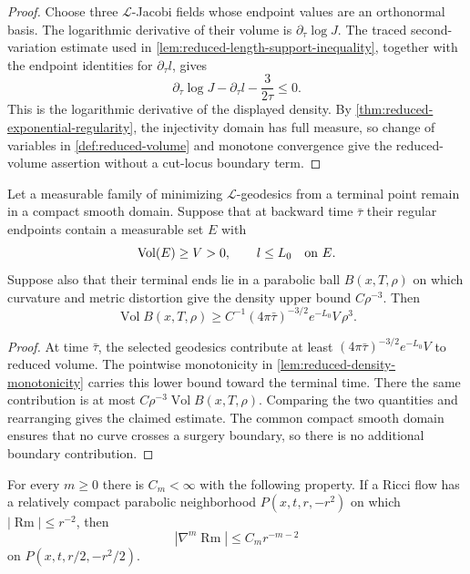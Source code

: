 \begin{proof}
Choose three $\mathcal L$-Jacobi fields whose endpoint values are an
orthonormal basis.  The logarithmic derivative of their volume is
$\partial_\tau\log J$.  The traced second-variation estimate used in
\ref{lem:reduced-length-support-inequality}, together with the endpoint
identities for $\partial_\tau l$, gives
\[
 \partial_\tau\log J-\partial_\tau l-\frac{3}{2\tau}\le0.
\]
This is the logarithmic derivative of the displayed density.  By
\ref{thm:reduced-exponential-regularity}, the injectivity domain has full
measure, so change of variables in \ref{def:reduced-volume} and monotone
convergence give the reduced-volume assertion without a cut-locus boundary
term.
\end{proof}

\begin{theorem}
\label{thm:reduced-volume-transfer}
\notready
Let a measurable family of minimizing $\mathcal L$-geodesics from a terminal
point remain in a compact smooth domain.  Suppose that at backward time
$\bar\tau$ their regular endpoints contain a measurable set $E$ with
\[
 \operatorname{Vol}(E)\ge V>0,
 \qquad l\le L_0\quad\hbox{on }E.
\]
Suppose also that their terminal ends lie in a parabolic ball
$B(x,T,\rho)$ on which curvature and metric distortion give the density
upper bound $C\rho^{-3}$.  Then
\[
 \operatorname{Vol}B(x,T,\rho)
 \ge C^{-1}(4\pi\bar\tau)^{-3/2}e^{-L_0}V\,\rho^3.
\]
\end{theorem}

\begin{proof}
At time $\bar\tau$, the selected geodesics contribute at least
$(4\pi\bar\tau)^{-3/2}e^{-L_0}V$ to reduced volume.  The pointwise
monotonicity in \ref{lem:reduced-density-monotonicity} carries this lower
bound toward the terminal time.  There the same contribution is at most
$C\rho^{-3}\operatorname{Vol}B(x,T,\rho)$.  Comparing the two quantities
and rearranging gives the claimed estimate.  The common compact smooth
domain ensures that no curve crosses a surgery boundary, so there is no
additional boundary contribution.
\end{proof}

\begin{theorem}
\label{thm:local-ricci-flow-derivative-estimates}
\notready
For every $m\ge0$ there is $C_m<\infty$ with the following property.  If a
Ricci flow has a relatively compact parabolic neighborhood
$P(x,t,r,-r^2)$ on which $|\operatorname{Rm}|\le r^{-2}$, then
\[
 |\nabla^m\operatorname{Rm}|
 \le C_m r^{-m-2}
\]
on $P(x,t,r/2,-r^2/2)$.
\end{theorem}

